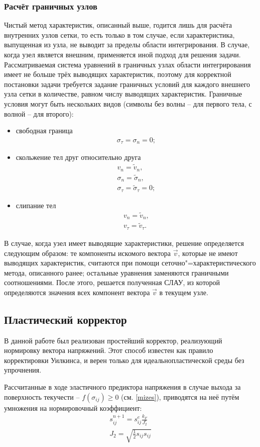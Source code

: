 \subsubsection{Расчёт граничных узлов}
Чистый метод характеристик, описанный выше, годится лишь для расчёта внутренних узлов
сетки, то есть только в том случае, если характеристика, выпущенная из узла, не
выводит за пределы области интегрирования. В случае, когда узел является
внешним, применяется иной подход для решения задачи. Рассматриваемая система
уравнений в граничных узлах области интегрирования имеет не больше трёх
\cite{chelnokov} выводящих характеристик, поэтому для корректной постановки
задачи требуется задание граничных условий для каждого внешнего узла сетки в
количестве, равном числу выводящих характеристик. Граничные условия могут быть
нескольких видов (символы без волны -- для первого тела, с волной -- для второго):
\begin{itemize}
\item{свободная граница
\begin{eqnarray}
\sigma_\tau=\sigma_n=0; \nonumber
\end{eqnarray}}
\item{скольжение тел друг относительно друга 
\begin{eqnarray}
v_n=\tilde{v}_n,\nonumber\\
\sigma_n=\tilde{\sigma}_n,\nonumber\\
\sigma_\tau=\tilde{\sigma}_\tau=0; \nonumber
\end{eqnarray}}
\item{слипание тел
\begin{eqnarray}
v_n=\tilde{v}_n,\nonumber\\
v_\tau=\tilde{v}_\tau.
\end{eqnarray}}
\end{itemize}
В случае, когда узел имеет выводящие характеристики, решение определяется
следующим образом: те компоненты искомого вектора $\vec{v}$, которые не имеют
выводящих характеристик, считаются при помощи сеточно"=характеристического
метода, описанного ранее; остальные уравнения заменяются граничными
соотношениями. После этого, решается полученная СЛАУ, из которой определяются
значения всех компонент вектора $\vec{v}$ в текущем узле.
\subsection{Пластический корректор}
В данной работе был реализован простейший корректор, реализующий нормировку вектора напряжений. Этот способ известен как правило корректировки Уилкинса, и верен только для идеальнопластической среды без упрочнения.

Рассчитанные в ходе эластичного предиктора напряжения в случае выхода за поверхность текучести --  $f(\sigma_{ij}) \geq 0$ (см. \ref{mizes}), приводятся на неё путём умножения на нормировочный коэффициент:
\begin{eqnarray}
s_{ij}^{n+1} = s_{ij}^e\frac{k_F}{J_2^e}	\\
J_2 = \sqrt{\frac{1}{2}s_{ij}s_{ij}}
\end{eqnarray} 